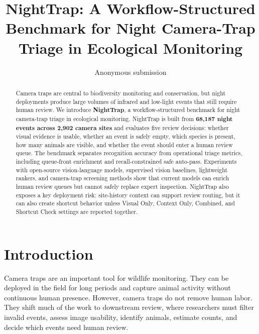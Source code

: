 \documentclass{article}
\title{NightTrap: A Workflow-Structured Benchmark for Night Camera-Trap Triage in Ecological Monitoring}
\author{Anonymous submission}
\date{}
\begin{document}
\maketitle

\begin{abstract}
Camera traps are central to biodiversity monitoring and conservation, but night deployments produce large volumes of infrared and low-light events that still require human review. We introduce \textbf{NightTrap}, a workflow-structured benchmark for night camera-trap triage in ecological monitoring. NightTrap is built from \textbf{68,187 night events across 2,902 camera sites} and evaluates five review decisions: whether visual evidence is usable, whether an event is safely empty, which species is present, how many animals are visible, and whether the event should enter a human review queue. The benchmark separates recognition accuracy from operational triage metrics, including queue-front enrichment and recall-constrained safe auto-pass. Experiments with open-source vision-language models, supervised vision baselines, lightweight rankers, and camera-trap screening methods show that current models can enrich human review queues but cannot safely replace expert inspection. NightTrap also exposes a key deployment risk: site-history context can support review routing, but it can also create shortcut behavior unless Visual Only, Context Only, Combined, and Shortcut Check settings are reported together.
\end{abstract}

\section{Introduction}

Camera traps are an important tool for wildlife monitoring. They can be deployed in the field for long periods and capture animal activity without continuous human presence. However, camera traps do not remove human labor. They shift much of the work to downstream review, where researchers must filter invalid events, assess image usability, identify animals, estimate counts, and decide which events need human review.
\end{document}
